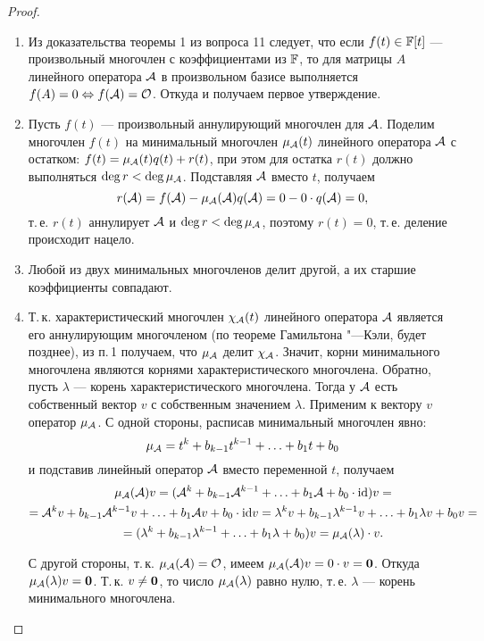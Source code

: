 \begin{proof}
    \begin{enumerate}
        \item Из доказательства теоремы 1 из вопроса 11 следует, что если $f(t) \in \mathbb{F}[t]$ --- произвольный многочлен с коэффициентами из $\mathbb{F}$, то для матрицы $A$ линейного оператора $\mathcal{A}$ в произвольном базисе выполняется $f(A) = 0 \Leftrightarrow f(\mathcal{A}) = \mathcal{O}$. Откуда и получаем первое утверждение.
        \item Пусть $f(t)$ --- произвольный аннулирующий многочлен для $\mathcal{A}$. Поделим многочлен $f(t)$ на минимальный многочлен $\mu_{\mathcal{A}}(t)$ линейного оператора $\mathcal{A}$ с остатком: $f(t) = \mu_{\mathcal{A}}(t)q(t) + r(t)$, при этом для остатка $r(t)$ должно выполняться $\deg r < \deg \mu_{\mathcal{A}}$. Подставляя $\mathcal{A}$ вместо $t$, получаем
            \[
                r(\mathcal{A}) = f(\mathcal{A}) - \mu_{\mathcal{A}}(\mathcal{A})q(\mathcal{A}) = 0 - 0 \cdot q(\mathcal{A}) = 0,
            \]
            т.\,е. $r(t)$ аннулирует $\mathcal{A}$ и $\deg r < \deg \mu_{\mathcal{A}}$, поэтому $r(t) = 0$, т.\,е. деление происходит нацело.
        \item Любой из двух минимальных многочленов делит другой, а их старшие коэффициенты совпадают.
        \item Т.\,к. характеристический многочлен $\chi_{\mathcal{A}}(t)$ линейного оператора $\mathcal{A}$ является его аннулирующим многочленом (по теореме Гамильтона "---Кэли, будет позднее), из п.\,1 получаем, что $\mu_{\mathcal{A}}$ делит $\chi_{\mathcal{A}}$. Значит, корни минимального многочлена являются корнями характеристического многочлена. Обратно, пусть $\lambda$ --- корень характеристического многочлена. Тогда у $\mathcal{A}$ есть собственный вектор $v$ с собственным значением $\lambda$. Применим к вектору $v$ оператор $\mu_{\mathcal{A}}$. С одной стороны, расписав минимальный многочлен явно:
            \[
                \mu_{\mathcal{A}} = t^k + b_{k - 1}t^{k - 1} + \ldots + b_1t + b_0
            \]
            и подставив линейный оператор $\mathcal{A}$ вместо переменной $t$, получаем
            \begin{multline*}
                \mu_{\mathcal{A}}(\mathcal{A})v = (\mathcal{A}^k + b_{k - 1}\mathcal{A}^{k - 1} + \ldots + b_1\mathcal{A} + b_0 \cdot \mathrm{id})v =\\ = \mathcal{A}^kv + b_{k - 1}\mathcal{A}^{k - 1}v + \ldots + b_1\mathcal{A} v + b_0 \cdot \mathrm{id} v = \lambda^kv + b_{k - 1}\lambda^{k - 1}v + \ldots + b_1\lambda v + b_0v =\\ = (\lambda^k + b_{k - 1}\lambda^{k - 1} + \ldots + b_1\lambda + b_0)v = \mu_{\mathcal{A}}(\lambda) \cdot v.
            \end{multline*}

            С другой стороны, т.\,к. $\mu_{\mathcal{A}}(\mathcal{A}) = \mathcal{O}$, имеем $\mu_{\mathcal{A}}(\mathcal{A})v = 0 \cdot v = \boldsymbol{0}$. Откуда $\mu_{\mathcal{A}}(\lambda)v = \boldsymbol{0}$. Т.\,к. $v \ne \boldsymbol{0}$, то число $\mu_{\mathcal{A}}(\lambda)$ равно нулю, т.\,е. $\lambda$ --- корень минимального многочлена.
    \end{enumerate}
\end{proof}

